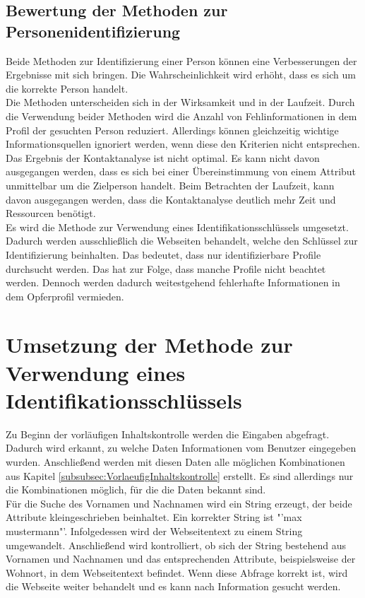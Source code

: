 	\subsection{Bewertung der Methoden zur Personenidentifizierung}
	Beide Methoden zur Identifizierung einer Person können eine Verbesserungen der Ergebnisse mit sich bringen. Die Wahrscheinlichkeit wird erhöht, dass es sich um die korrekte Person handelt. \\
	Die Methoden unterscheiden sich in der Wirksamkeit und in der Laufzeit. Durch die Verwendung beider Methoden wird die Anzahl von Fehlinformationen in dem Profil der gesuchten Person reduziert. Allerdings können gleichzeitig wichtige Informationsquellen ignoriert werden, wenn diese den Kriterien nicht entsprechen.\\
	Das Ergebnis der Kontaktanalyse ist nicht optimal. Es kann nicht davon ausgegangen werden, dass es sich bei einer Übereinstimmung von einem  Attribut unmittelbar um die Zielperson handelt. Beim Betrachten der Laufzeit,  kann davon ausgegangen werden, dass die Kontaktanalyse deutlich mehr Zeit und Ressourcen benötigt.\\
	Es wird die Methode zur Verwendung eines Identifikationsschlüssels umgesetzt. Dadurch werden ausschließlich die Webseiten behandelt, welche den Schlüssel zur Identifizierung beinhalten. Das bedeutet, dass nur identifizierbare Profile durchsucht werden. Das hat zur Folge, dass manche Profile nicht beachtet werden. Dennoch werden dadurch weitestgehend fehlerhafte Informationen in dem Opferprofil vermieden.


\section{Umsetzung der Methode zur Verwendung eines Identifikationsschlüssels}
Zu Beginn der vorläufigen Inhaltskontrolle werden die Eingaben abgefragt. Dadurch wird erkannt, zu welche Daten Informationen vom Benutzer eingegeben wurden. Anschließend werden mit diesen Daten alle möglichen Kombinationen aus Kapitel \ref{subsubsec:VorlaeufigInhaltskontrolle} erstellt. Es sind allerdings nur die Kombinationen möglich, für die die Daten bekannt sind.\\
Für die Suche des Vornamen und Nachnamen wird ein String erzeugt, der beide Attribute kleingeschrieben beinhaltet. Ein korrekter String ist "'max mustermann"'. Infolgedessen wird der Webseitentext zu einem String umgewandelt. Anschließend wird kontrolliert, ob sich der String bestehend aus Vornamen und Nachnamen und das entsprechenden Attribute, beispielsweise der Wohnort, in dem Webseitentext befindet. Wenn diese Abfrage korrekt ist, wird die Webseite weiter behandelt und es kann nach Information gesucht werden.

